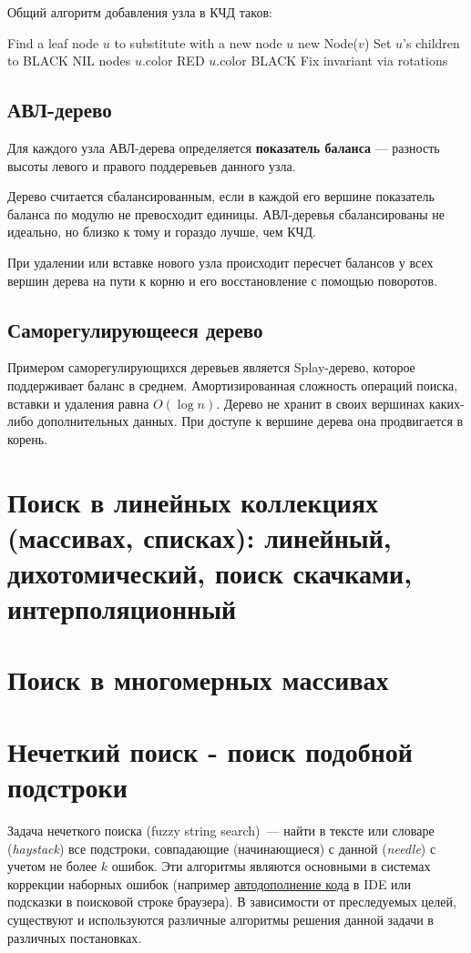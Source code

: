 Общий алгоритм добавления узла в КЧД таков:
\begin{algorithmic}
    \State Find a leaf node $u$ to substitute with a new node
    \State $u$ \asgn new Node($v$)
    \State Set $u$'s children to BLACK NIL nodes
    \State $u$.color \asgn RED
      \State $u$.color \asgn BLACK
      \State Fix invariant via rotations
    \EndIf
  \EndProcedure
\end{algorithmic}
\subsection{АВЛ-дерево}
Для каждого узла АВЛ-дерева определяется \textbf{показатель баланса} --- разность
высоты левого и правого поддеревьев данного узла.

Дерево считается сбалансированным, если в каждой его вершине показатель баланса
по модулю не превосходит единицы. АВЛ-деревья сбалансированы не идеально, но близко
к тому и гораздо лучше, чем КЧД.

При удалении или вставке нового узла происходит пересчет балансов у всех вершин дерева на пути к корню
и его восстановление с помощью поворотов.

\subsection{Саморегулирующееся дерево}
Примером саморегулирующихся деревьев является Splay-дерево, которое поддерживает баланс в среднем.
Амортизированная сложность операций поиска, вставки и удаления равна $O(\log n)$. Дерево не хранит
в своих вершинах каких-либо дополнительных данных. При доступе к вершине дерева она продвигается в корень.


\section{Поиск в линейных коллекциях (массивах, списках): линейный, дихотомический, поиск скачками, интерполяционный}
\section{Поиск в многомерных массивах}
\section{Нечеткий поиск - поиск подобной подстроки}
Задача нечеткого поиска (fuzzy string search)~--- найти в тексте или словаре (\textit{haystack}) все подстроки, совпадающие
(начинающиеся) с данной (\textit{needle}) с учетом не более \(k\) ошибок.
Эти алгоритмы являются основными в системах коррекции наборных ошибок
(например \href{https://en.wikipedia.org/wiki/Code_completion}{автодополнение кода} в IDE или подсказки в поисковой строке браузера).
В зависимости от преследуемых целей, существуют и используются различные алгоритмы решения данной задачи в различных постановках.

